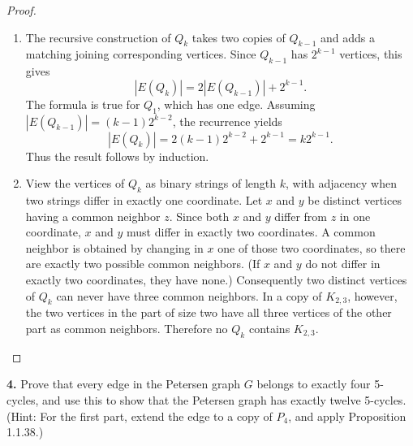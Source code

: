 \documentclass[12pt]{amsart}
\theoremstyle{conjecture}
\theoremstyle{definition}
\theoremstyle{question}
\theoremstyle{theorem}
\begin{document}
    \begin{proof}
        \begin{enumerate}[label=(\alph*)]
            \item The recursive construction of $Q_k$ takes two copies of $Q_{k-1}$ and adds a matching
            joining corresponding vertices. Since $Q_{k-1}$ has $2^{k-1}$ vertices, this gives
            \[
                |E(Q_k)|=2|E(Q_{k-1})|+2^{k-1}.
            \]
            The formula is true for $Q_1$, which has one edge. Assuming
            $|E(Q_{k-1})|=(k-1)2^{k-2}$, the recurrence yields
            \[
                |E(Q_k)|=2(k-1)2^{k-2}+2^{k-1}=k2^{k-1}.
            \]
            Thus the result follows by induction.

            \item View the vertices of $Q_k$ as binary strings of length $k$, with adjacency when two
            strings differ in exactly one coordinate. Let $x$ and $y$ be distinct vertices having a common
            neighbor $z$. Since both $x$ and $y$ differ from $z$ in one coordinate, $x$ and $y$ must differ
            in exactly two coordinates. A common neighbor is obtained by changing in $x$ one of those two
            coordinates, so there are exactly two possible common neighbors. (If $x$ and $y$ do not differ
            in exactly two coordinates, they have none.) Consequently two distinct vertices of $Q_k$ can
            never have three common neighbors. In a copy of $K_{2,3}$, however, the two vertices in the
            part of size two have all three vertices of the other part as common neighbors. Therefore no
            $Q_k$ contains $K_{2,3}$.
        \end{enumerate}
    \end{proof}

    \noindent\textbf{4.} Prove that every edge in the Petersen graph $G$ belongs to exactly four 5-cycles,
    and use this to show that the Petersen graph has exactly twelve 5-cycles.
    (Hint: For the first part, extend the edge to a copy of $P_4$, and apply Proposition 1.1.38.)
\end{document}
